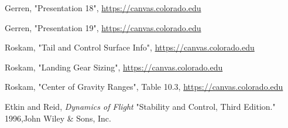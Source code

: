 \documentclass[conf]{new-aiaa}
\begin{document}
\begin{thebibliography}{99}

 Gerren, "Presentation 18", \url{https://canvas.colorado.edu}

 Gerren, "Presentation 19", \url{https://canvas.colorado.edu}

 Roskam, "Tail and Control Surface Info", \url{https://canvas.colorado.edu}

 Roskam, "Landing Gear Sizing", \url{https://canvas.colorado.edu}

 Roskam, "Center of Gravity Ranges", Table 10.3, \url{https://canvas.colorado.edu}

 Etkin and Reid, \textit{Dynamics of Flight} "Stability and Control, Third Edition." 1996,John Wiley \& Sons, Inc.







\end{thebibliography}
\end{document}

